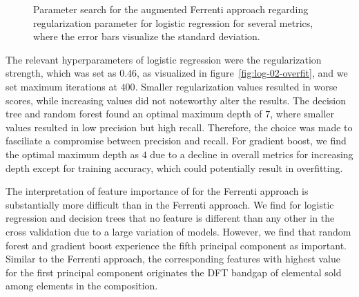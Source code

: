 \begin{wrapfigure}{R}{0.5\textwidth}

  \begin{subfigure}[b]{1.0\textwidth}
  
  \end{subfigure}

  \begin{subfigure}[b]{1.0\textwidth}
  
  \end{subfigure}
  \vspace*{-130mm}
  \caption{Parameter search for the augmented Ferrenti approach regarding regularization parameter for logistic regression for several metrics, where the error bars visualize the standard deviation.}
  \label{fig:log-02-overfit}
\end{wrapfigure}


The relevant hyperparameters of logistic regression were the regularization strength, which was set as $0.46$, as visualized in figure \autoref{fig:log-02-overfit}, and we set maximum iterations at $400$. Smaller regularization values resulted in worse scores, while increasing values did not noteworthy alter the results. The decision tree and random forest found an optimal maximum depth of $7$, where smaller values resulted in low precision but high recall. Therefore, the choice was made to fasciliate a compromise between precision and recall. For gradient boost, we find the optimal maximum depth as $4$ due to a decline in overall metrics for increasing depth except for training accuracy, which could potentially result in overfitting.


The interpretation of feature importance of for the Ferrenti approach is substantially more difficult than in the Ferrenti approach. We find for logistic regression and decision trees that no feature is different than any other in the cross validation due to a large variation of models. However, we find that random forest and gradient boost experience the fifth principal component as important. Similar to the Ferrenti approach, the corresponding features with highest value for the first principal component originates the DFT bandgap of elemental sold among elements in the composition.

